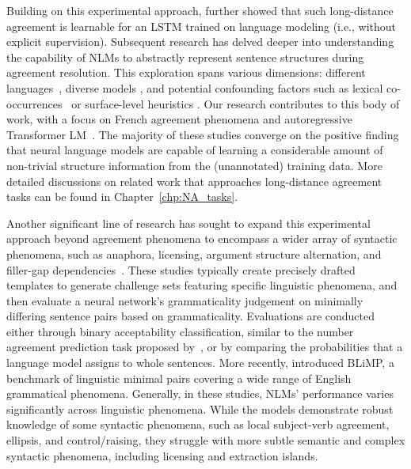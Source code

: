 Building on this experimental approach, \cite{gulordava-etal-2018-colorless} further showed that such long-distance agreement is learnable for an LSTM trained on language modeling (i.e., without explicit supervision). Subsequent research has delved deeper into understanding the capability of NLMs to abstractly represent sentence structures during agreement resolution. This exploration spans various dimensions: different languages~\citep{ravfogel-etal-2018-lstm,gulordava-etal-2018-colorless,lakretz2021mechanisms}, diverse models \citep{bernardy-lappin-2017-using,goldberg19assessing}, and potential confounding factors such as lexical co-occurrences~\citep{gulordava-etal-2018-colorless,lasri-etal-2022-bert} or surface-level heuristics \citep{kuncoro2018perils}. Our research contributes to this body of work, with a focus on French agreement phenomena and autoregressive Transformer LM~\citep{li-etal-2021-transformers}. The majority of these studies converge on the positive finding that neural language models are capable of learning a considerable amount of non-trivial structure information from the (unannotated) training data. More detailed discussions on related work that approaches long-distance agreement tasks can be found in Chapter~\ref{chp:NA_tasks}.

Another significant line of research has sought to expand this experimental approach beyond agreement phenomena to encompass a wider array of syntactic phenomena, such as anaphora, licensing, argument structure alternation, and filler-gap dependencies~. These studies typically create precisely drafted templates to generate challenge sets featuring specific linguistic phenomena, and then evaluate a neural network's grammaticality judgement on minimally differing sentence pairs based on grammaticality. Evaluations are conducted either through binary acceptability classification, similar to the number agreement prediction task proposed by~\cite{linzen-etal-2016-assessing}, or by comparing the probabilities that a language model assigns to whole sentences. More recently, \cite{warstadt-etal-2020-blimp} introduced BLiMP, a benchmark of linguistic minimal pairs covering a wide range of English grammatical phenomena. Generally, in these studies, NLMs' performance varies significantly across linguistic phenomena. While the models demonstrate robust knowledge of some syntactic phenomena, such as local subject-verb agreement, ellipsis, and control/raising, they struggle with more subtle semantic and complex syntactic phenomena, including licensing and extraction islands.


